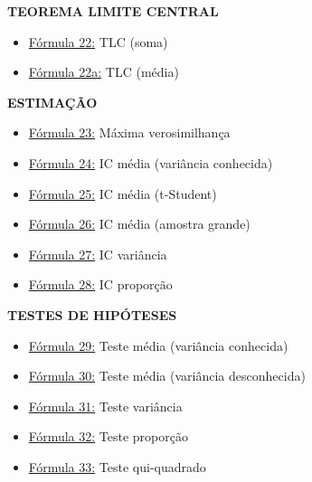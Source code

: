 \documentclass[a4paper,12pt]{article}
\begin{document}
\begin{multicols}{2}
\textbf{\color{sectioncolor}TEOREMA LIMITE CENTRAL}
\begin{itemize}[leftmargin=*]
    \item \hyperref[formula22]{\color{formulalink}Fórmula 22:} TLC (soma)
    \item \hyperref[formula22a]{\color{formulalink}Fórmula 22a:} TLC (média)
\end{itemize}

\textbf{\color{sectioncolor}ESTIMAÇÃO}
\begin{itemize}[leftmargin=*]
    \item \hyperref[formula23]{\color{formulalink}Fórmula 23:} Máxima verosimilhança
    \item \hyperref[formula24]{\color{formulalink}Fórmula 24:} IC média (variância conhecida)
    \item \hyperref[formula25]{\color{formulalink}Fórmula 25:} IC média (t-Student)
    \item \hyperref[formula26]{\color{formulalink}Fórmula 26:} IC média (amostra grande)
    \item \hyperref[formula27]{\color{formulalink}Fórmula 27:} IC variância
    \item \hyperref[formula28]{\color{formulalink}Fórmula 28:} IC proporção
\end{itemize}

\textbf{\color{sectioncolor}TESTES DE HIPÓTESES}
\begin{itemize}[leftmargin=*]
    \item \hyperref[formula29]{\color{formulalink}Fórmula 29:} Teste média (variância conhecida)
    \item \hyperref[formula30]{\color{formulalink}Fórmula 30:} Teste média (variância desconhecida)
    \item \hyperref[formula31]{\color{formulalink}Fórmula 31:} Teste variância
    \item \hyperref[formula32]{\color{formulalink}Fórmula 32:} Teste proporção
    \item \hyperref[formula33]{\color{formulalink}Fórmula 33:} Teste qui-quadrado
\end{itemize}


\end{multicols}
\end{document}
